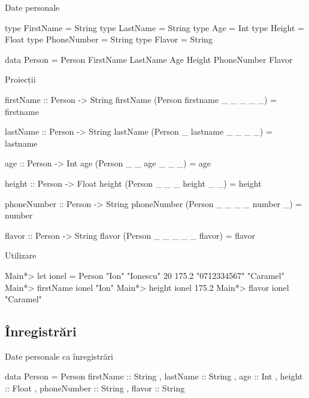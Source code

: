 \documentclass[xcolor=pdftex,romanian,colorlinks]{beamer}
\begin{document}
\begin{frame}[fragile]{Date personale}
\begin{asciihs}
type FirstName  = String  
type LastName   = String  
type Age        = Int  
type Height     = Float  
type PhoneNumber = String  
type Flavor      = String  
                     
data Person = Person FirstName LastName Age Height
    PhoneNumber Flavor


\end{asciihs}

\end{frame}

\begin{frame}[fragile]{Proiecții}
\begin{asciihs}
    firstName :: Person -> String  
    firstName (Person firstname _ _ _ _ _) = firstname  
      
    lastName :: Person -> String  
    lastName (Person _ lastname _ _ _ _) = lastname  
      
    age :: Person -> Int  
    age (Person _ _ age _ _ _) = age  
      
    height :: Person -> Float  
    height (Person _ _ _ height _ _) = height  
      
    phoneNumber :: Person -> String  
    phoneNumber (Person _ _ _ _ number _) = number  
      
    flavor :: Person -> String  
    flavor (Person _ _ _ _ _ flavor) = flavor  
\end{asciihs}
\end{frame}

\begin{frame}[fragile]{Utilizare}
\begin{asciihs}
Main*> let ionel = Person "Ion" "Ionescu" 20 175.2 
    "0712334567" "Caramel"
Main*> firstName ionel
"Ion"  
Main*> height ionel
175.2  
Main*> flavor ionel  
"Caramel"  
\end{asciihs}
\end{frame}

\subsection{Înregistrări}

\begin{frame}[fragile]{Date personale ca înregistrări}
\begin{asciihs}
data Person = Person { firstName :: String  
                     , lastName :: String  
                     , age :: Int  
                     , height :: Float  
                     , phoneNumber :: String  
                     , flavor :: String  
                     }
\end{asciihs}
\end{frame}
\end{document}
